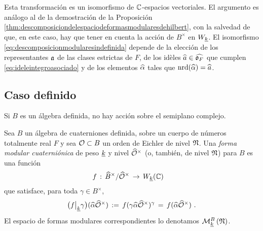 %
Esta transformaci\'{o}n es un isomorfismo de $\bb{C}$-espacios vectoriales.
El argumento es an\'{a}logo al de la demostraci\'{o}n de la Proposici\'{o}n
\ref{thm:descomposiciondelespaciodeformasmodularesdehilbert}, con la salvedad
de que, en este caso, hay que tener en cuenta la acci\'{o}n de $B^{\times}$
en $W_{\peso{k}}$.
El isomorfismo \eqref{eq:descomposicionmodularesindefinida} depende de la
elecci\'{o}n de los representantes $\frak{a}$ de las clases estrictas de $F$,
de los id\`{e}les $\hhat{a}\in\Adfin{\oka{F}}$ que cumplen
\eqref{eq:ideleintegroasociado} y de los elementos $\hhat{\alpha}$ tales que
$\nrd(\hhat{\alpha})=\hhat{a}$.

\subsection{Caso definido}%
Si $B$ es un \'{a}lgebra definida, no hay acci\'{o}n sobre el semiplano
complejo.

\begin{defFormaCuaternionicaCasoDefinido}%
	\label{def:formacuaternionicacasodefinido}
	Sea $B$ un \'{a}lgebra de cuaterniones definida, sobre un cuerpo de
	n\'{u}meros totalmente real $F$ y sea $\cal{O}\subset B$ un orden de
	Eichler de nivel $\frak{N}$. Una \emph{forma modular cuaterni\'{o}nica}
	de peso $\peso{k}$ y nivel $\Idfin{\cal{O}}$ (o, tambi\'{e}n, de nivel
	$\frak{N}$) para $B$ es una funci\'{o}n
	\begin{align*}
		f & \,:\,\Idfin{B}/\Idfin{\cal{O}}\,\rightarrow\,
			W_{\peso{k}}(\bb{C})
	\end{align*}
	que satisface, para toda $\gamma\in B^{\times}$,
	\begin{equation}
		\label{eq:definidaoperadordepesok}
		\big(f\operadormatrices{\peso{k}}{\gamma}\big)
			(\hhat{\alpha}\Idfin{\cal{O}})
			\,:=\, f(\gamma\hhat{\alpha}\Idfin{\cal{O}})^{\gamma}
			\,=\, f(\hhat{\alpha}\Idfin{\cal{O}})
		\text{ .}
	\end{equation}
	El espacio de formas modulares correspondientes lo denotamos
	$\modularH[B]{k}{\frak{N}}$.
\end{defFormaCuaternionicaCasoDefinido}

